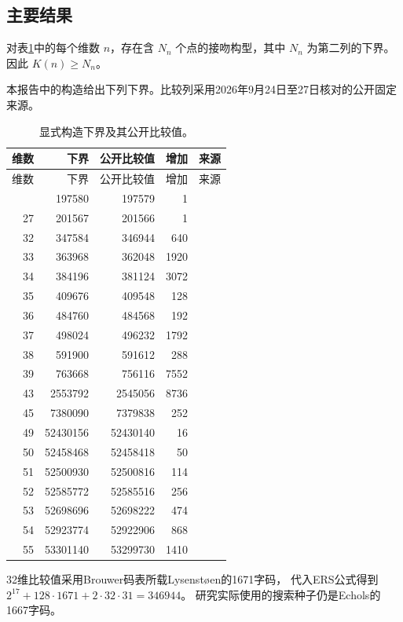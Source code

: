 \subsection{主要结果}

\begin{theorem}\label{thm:main}
对表\ref{tab:results}中的每个维数 $n$，存在含 $N_n$ 个点的接吻构型，其中 $N_n$ 为第二列的下界。因此 $K(n)\ge N_n$。
\end{theorem}

本报告中的构造给出下列下界。比较列采用2026年9月24日至27日核对的公开固定来源。

\begin{longtable}{rrrrl}
\caption{显式构造下界及其公开比较值。}\label{tab:results}\\
\toprule
维数 & 下界 & 公开比较值 & 增加 & 来源\\\midrule
\endfirsthead
\toprule
维数 & 下界 & 公开比较值 & 增加 & 来源\\\midrule
\endhead
\bottomrule\endfoot
25 & 197580 & 197579 & 1 & \cite{kissingnumbers} \\
27 & 201567 & 201566 & 1 & \cite{lindow27} \\
32 & 347584 & 346944 & 640 & \cite{brouwer} \\
33 & 363968 & 362048 & 1920 & \cite{brouwer} \\
34 & 384196 & 381124 & 3072 & \cite{brouwer} \\
35 & 409676 & 409548 & 128 & \cite{brouwer} \\
36 & 484760 & 484568 & 192 & \cite{brouwer} \\
37 & 498024 & 496232 & 1792 & \cite{brouwer} \\
38 & 591900 & 591612 & 288 & \cite{kissingnumbers} \\
39 & 763668 & 756116 & 7552 & \cite{kissingnumbers} \\
43 & 2553792 & 2545056 & 8736 & \cite{sunwang-sections,crosssections} \\
45 & 7380090 & 7379838 & 252 & \cite{sunwang-sections,crosssections} \\
49 & 52430156 & 52430140 & 16 & \cite{kissingnumbers} \\
50 & 52458468 & 52458418 & 50 & \cite{kissingnumbers} \\
51 & 52500930 & 52500816 & 114 & \cite{kissingnumbers} \\
52 & 52585772 & 52585516 & 256 & \cite{kissingnumbers} \\
53 & 52698696 & 52698222 & 474 & \cite{kissingnumbers} \\
54 & 52923774 & 52922906 & 868 & \cite{kissingnumbers} \\
55 & 53301140 & 53299730 & 1410 & \cite{kissingnumbers} \\
\end{longtable}

32维比较值采用Brouwer码表所载Lysenst\o en的1671字码\cite{brouwer}，
代入ERS公式得到$2^{17}+128\cdot1671+2\cdot32\cdot31=346944$。
研究实际使用的搜索种子仍是Echols的1667字码\cite{echols}。
